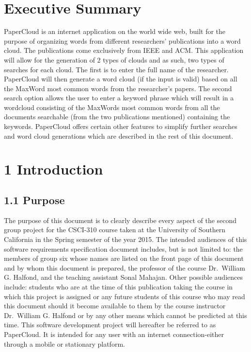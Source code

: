 \documentclass[]{article}
\author{}
\date{}
\begin{document}
\section{Executive Summary}\label{executive-summary}

PaperCloud is an internet application on the world wide web, built for
the purpose of organizing words from different researchers' publications
into a word cloud. The publications come exclusively from IEEE and ACM.
This application will allow for the generation of 2 types of clouds and
as such, two types of searches for each cloud. The first is to enter the
full name of the researcher. PaperCloud will then generate a word cloud
(if the input is valid) based on all the MaxWord most common words from
the researcher's papers. The second search option allows the user to
enter a keyword phrase which will result in a wordcloud consisting of
the MaxWords most common words from all the documents searchable (from
the two publications mentioned) containing the keywords. PaperCloud
offers certain other features to simplify further searches and word
cloud generations which are described in the rest of this document.

\section{1 Introduction}\label{introduction}

\subsection{1.1 Purpose}\label{purpose}

The purpose of this document is to clearly describe every aspect of the
second group project for the CSCI-310 course taken at the University of
Southern California in the Spring semester of the year 2015. The
intended audiences of this software requirements specification document
includes, but is not limited to: the members of group six whose names
are listed on the front page of this document and by whom this document
is prepared, the professor of the course Dr.~William G. Halfond, and the
teaching assistant Sonal Mahajan. Other possible audiences include:
students who are at the time of this publication taking the course in
which this project is assigned or any future students of this course who
may read this document should it become available to them by the course
instructor Dr.~William G. Halfond or by any other means which cannot be
predicted at this time. This software development project will hereafter
be referred to as PaperCloud. It is intended for any user with an
internet connection-either through a mobile or stationary platform.
\end{document}
